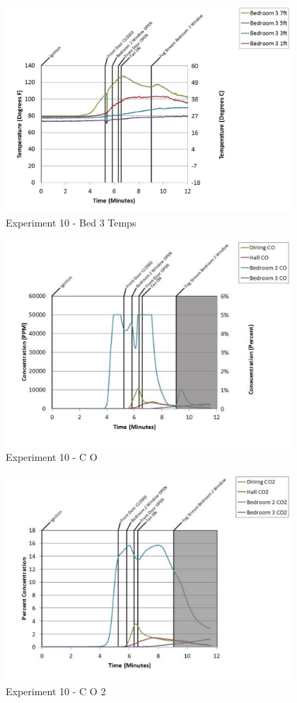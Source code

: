 \documentclass{article}
\begin{document}
\begin{appendices}
	\clearpage

	\begin{figure}[h!]
		\centering
		\includegraphics[height=3.05in]{0_Images/Results_Charts/Exp_10_Charts/Bed3Temps.pdf}
		\caption{Experiment 10 - Bed 3 Temps}
	\end{figure}
 

	\begin{figure}[h!]
		\centering
		\includegraphics[height=3.05in]{0_Images/Results_Charts/Exp_10_Charts/CO.pdf}
		\caption{Experiment 10 - C O}
	\end{figure}
 
	\clearpage

	\begin{figure}[h!]
		\centering
		\includegraphics[height=3.05in]{0_Images/Results_Charts/Exp_10_Charts/CO2.pdf}
		\caption{Experiment 10 - C O 2}
	\end{figure}
 


\end{appendices}
\end{document}
